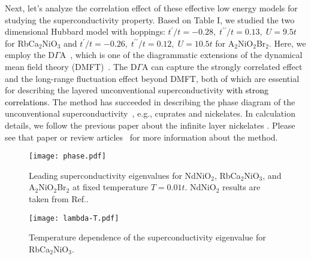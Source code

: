 \documentclass[%
 aip,
 amsmath,amssymb,
 reprint,%
]{revtex4-1}
\newcommand{\mk}[1]{{\textcolor{black}{#1}}}
\begin{document}
Next, let's analyze the correlation effect of these effective low energy models for studying the superconductivity property. Based on Table I, we studied the two dimensional Hubbard model with hoppings: $t^{\prime}/t=-0.28,\; t^{\prime\prime}/t=0.13,\; U=9.5t$ for RbCa$_2$NiO$_3$ and $t^{\prime}/t=-0.26,\; t^{\prime\prime}/t=0.12,\; U=10.5t$ for A$_2$NiO$_2$Br$_2$. Here, we employ the D$\Gamma$A~\cite{Toschi_2007,Katanin_2009,Rohringer_2018}, which is one of the diagrammatic extensions of the dynamical mean field theory (DMFT)~\cite{Metzner_1989,Georges_1992,Georges_1996}. The D$\Gamma$A can capture the strongly correlated effect and the long-range fluctuation effect beyond DMFT, both of which are essential for describing the layered unconventional superconductivity \mk{with strong correlations}. The method has succeeded in describing the phase diagram of the unconventional superconductivity~\cite{Kitatani_2019,Kitatani_2020}, e.g., cuprates and nickelates. In calculation details, we follow the previous paper about the infinite layer nickelates \cite{Kitatani_2020}. Please see that paper or review articles~\cite{Rohringer_2018,Held_2022,Kitatani_2022} for more information about the method.

\begin{figure}
\centering
\texttt{[image: phase.pdf]}
\caption{Leading superconductivity eigenvalues for NdNiO$_2$, RbCa$_2$NiO$_3$, and A$_2$NiO$_2$Br$_2$ at fixed temperature $T=0.01t$. NdNiO$_2$ results are taken from Ref..}
\label{fig:phase}
\end{figure}

\begin{figure}
\centering
\texttt{[image: lambda-T.pdf]}
\caption{Temperature dependence of the superconductivity eigenvalue for RbCa$_2$NiO$_3$.}
\label{fig:lambda-T}
\end{figure}
\end{document}
